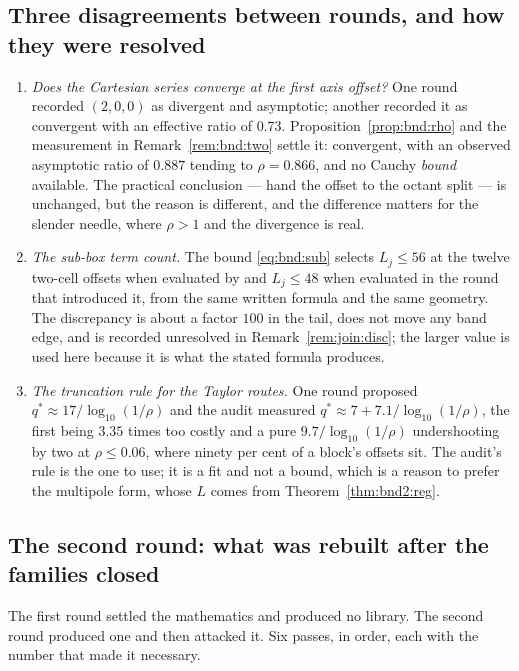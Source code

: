 \subsection{Three disagreements between rounds, and how they were resolved}
\label{sec:reg:disc}

\begin{enumerate}[nosep,leftmargin=1.6em]
\item \emph{Does the Cartesian series converge at the first axis offset?} One round
recorded $(2,0,0)$ as divergent and asymptotic; another recorded it as convergent with an
effective ratio of $0.73$. Proposition~\ref{prop:bnd:rho} and the measurement in
Remark~\ref{rem:bnd:two} settle it: convergent, with an observed asymptotic ratio of
$0.887$ tending to $\rho = 0.866$, and no Cauchy \emph{bound} available. The practical
conclusion --- hand the offset to the octant split --- is unchanged, but the reason is
different, and the difference matters for the slender needle, where $\rho > 1$ and the
divergence is real.
\item \emph{The sub-box term count.} The bound \eqref{eq:bnd:sub} selects
$L_j \le 56$ at the twelve two-cell offsets when evaluated by  and
$L_j \le 48$ when evaluated in the round that introduced it, from the same written
formula and the same geometry. The discrepancy is about a factor $100$ in the tail, does
not move any band edge, and is recorded unresolved in Remark~\ref{rem:join:disc}; the
larger value is used here because it is what the stated formula produces.
\item \emph{The truncation rule for the Taylor routes.} One round proposed
$q^* \approx 17/\log_{10}(1/\rho)$ and the audit measured $q^* \approx 7 +
7.1/\log_{10}(1/\rho)$, the first being $3.35$ times too costly and a pure
$9.7/\log_{10}(1/\rho)$ undershooting by two at $\rho \le 0.06$, where ninety per cent of
a block's offsets sit. The audit's rule is the one to use; it is a fit and not a bound,
which is a reason to prefer the multipole form, whose $L$ comes from
Theorem~\ref{thm:bnd2:reg}.
\end{enumerate}

\subsection{The second round: what was rebuilt after the families closed}
\label{sec:reg:r2}

The first round settled the mathematics and produced no library. The second round produced
one and then attacked it. Six passes, in order, each with the number that made it necessary.

